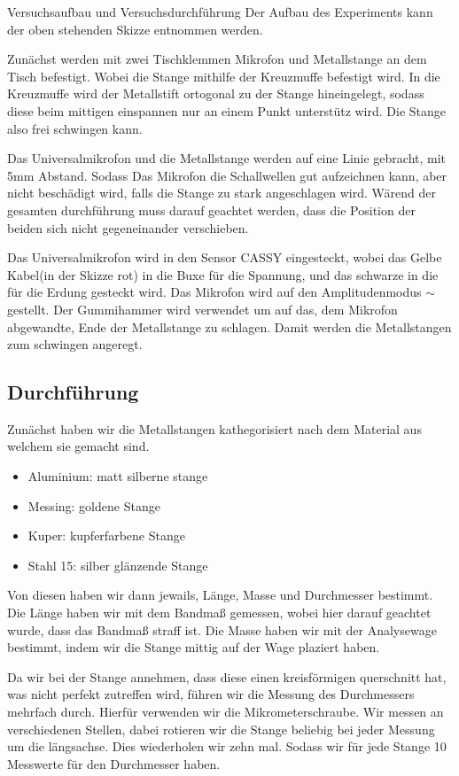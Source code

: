 \documentclass[twoside]{protokoll}
\begin{document}
\begin{aufgabe}{Versuchsaufbau und Versuchsdurchführung}
Der Aufbau des Experiments kann der oben stehenden Skizze entnommen werden. 

Zunächst werden mit zwei Tischklemmen Mikrofon und Metallstange an dem Tisch befestigt. Wobei die Stange mithilfe der Kreuzmuffe befestigt wird. In die Kreuzmuffe wird der Metallstift ortogonal zu der Stange hineingelegt, sodass diese beim mittigen einspannen nur an einem Punkt unterstütz wird. Die Stange also frei schwingen kann. 

Das Universalmikrofon und die Metallstange werden auf eine Linie gebracht, mit 5mm Abstand. Sodass Das Mikrofon die Schallwellen gut aufzeichnen kann, aber nicht beschädigt wird, falls die Stange zu stark angeschlagen wird. Wärend der gesamten durchführung muss darauf geachtet werden, dass die Position der beiden sich nicht gegeneinander verschieben. 


Das Universalmikrofon wird in den Sensor CASSY eingesteckt, wobei das Gelbe Kabel(in der Skizze rot) in die Buxe für die Spannung, und das schwarze in die für die Erdung gesteckt wird. Das Mikrofon wird auf den Amplitudenmodus $\sim$ gestellt. Der Gummihammer wird verwendet um auf das, dem Mikrofon abgewandte, Ende der Metallstange zu schlagen. Damit werden die Metallstangen zum schwingen angeregt.

\subsection{Durchführung}

Zunächst haben wir die Metallstangen kathegorisiert nach dem Material aus welchem sie gemacht sind.

\begin{itemize}
\item Aluminium:		 matt silberne stange 
\item Messing:		 goldene Stange
\item Kuper:			 kupferfarbene Stange
\item Stahl 15:		 silber glänzende Stange
\end{itemize}

Von diesen haben wir dann jewails, Länge, Masse und Durchmesser bestimmt. 
Die Länge haben wir mit dem Bandmaß gemessen, wobei hier darauf geachtet wurde, dass das Bandmaß straff ist. Die Masse haben wir mit der Analysewage bestimmt, indem wir die Stange mittig auf der Wage plaziert haben. 


Da wir bei der Stange annehmen, dass diese einen kreisförmigen querschnitt hat, was nicht perfekt zutreffen wird, führen wir die Messung des Durchmessers mehrfach durch. Hierfür verwenden wir die Mikrometerschraube. Wir messen an verschiedenen Stellen, dabei rotieren wir die Stange beliebig bei jeder Messung um die längsachse. Dies wiederholen wir zehn mal. Sodass wir für jede Stange 10 Messwerte für den Durchmesser haben.\\ 


\end{aufgabe}
\end{document}

